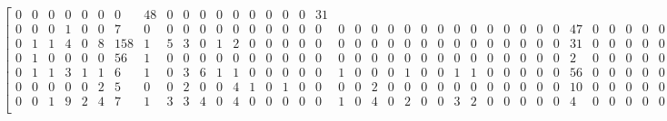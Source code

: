 \begin{equation*}
\begin{bmatrix}
0	&	0	&	0	&	0	&	0	&	0	&	0	&	48	&	0	&	0	&	0	&	0	&	0	&	0	&	0	&	0	&	0	&	31 \\
0	&	0	&	0	&	1	&	0	&	0	&	7	&	0	&	0	&	0	&	0	&	0	&	0	&	0	&	0	&	0	&	0	&	0	&	0	&	0	&	0	&	0	&	0	&	0	&	0	&
0	&	0	&	0	&	0	&	0	&	0	&	0	&	47	&	0	&	0	&	0	&	0	&	0	&	0	&	0	&	0	&	5	&	0 \\
0	&	1	&	1	&	4	&	0	&	8	&	158	&	1	&	5	&	3	&	0	&	1	&	2	&	0	&	0	&	0	&	0	&	0	&	0	&	0	&	0	&	0	&	0	&	0	&	0	&
0	&	0	&	0	&	0	&	0	&	0	&	0	&	31	&	0	&	0	&	0	&	0	&	0	&	0	&	0	&	0	&	108	&	97 \\
0	&	1	&	0	&	0	&	0	&	0	&	56	&	1	&	0	&	0	&	0	&	0	&	0	&	0	&	0	&	0	&	0	&	0	&	0	&	0	&	0	&	0	&	0	&	0	&	0	&
0	&	0	&	0	&	0	&	0	&	0	&	0	&	2	&	0	&	0	&	0	&	0	&	0	&	0	&	0	&	0	&	0	&	0 \\
0	&	1	&	1	&	3	&	1	&	1	&	6	&	1	&	0	&	3	&	6	&	1	&	1	&	0	&	0	&	0	&	0	&	0	&	1	&	0	&	0	&	0	&	1	&	0	&	0	&
1	&	1	&	0	&	0	&	0	&	0	&	0	&	56	&	0	&	0	&	0	&	0	&	0	&	0	&	0	&	0	&	1	&	4 \\
0	&	0	&	0	&	0	&	0	&	2	&	5	&	0	&	0	&	2	&	0	&	0	&	4	&	1	&	0	&	1	&	0	&	0	&	0	&	0	&	2	&	0	&	0	&	0	&	0	&
0	&	0	&	0	&	0	&	0	&	0	&	0	&	10	&	0	&	0	&	0	&	0	&	0	&	0	&	0	&	0	&	29	&	4 \\
0	&	0	&	1	&	9	&	2	&	4	&	7	&	1	&	3	&	3	&	4	&	0	&	4	&	0	&	0	&	0	&	0	&	0	&	1	&	0	&	4	&	0	&	2	&	0	&	0	&
3	&	2	&	0	&	0	&	0	&	0	&	0	&	4	&	0	&	0	&	0	&	0	&	0	&	0	&	0	&	0	&	0	&	6 \\
\end{bmatrix}
\end{equation*}
